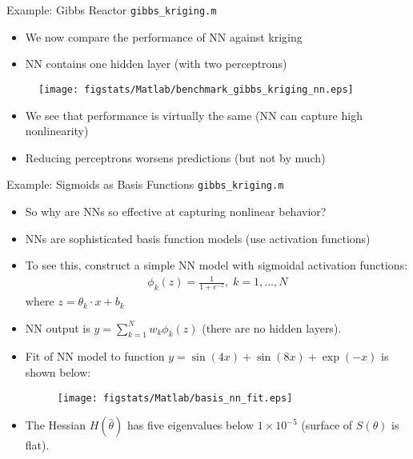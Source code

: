 \documentclass[9pt]{beamer}
\begin{document}
\begin{frame}{Example: Gibbs Reactor \footnotesize{\texttt{gibbs\_kriging.m}}}

\begin{itemize}
   \setlength{\itemsep}{5pt}
\item We now compare the performance of NN against kriging
\item NN contains one hidden layer (with two perceptrons) 
\end{itemize}


\begin{figure}[!htb]
    \centering
	\texttt{[image: figstats/Matlab/benchmark\_gibbs\_kriging\_nn.eps]}
\end{figure}

\begin{itemize}
   \setlength{\itemsep}{5pt}
\item We see that performance is virtually the same (NN can capture high nonlinearity)
\item Reducing perceptrons worsens predictions (but not by much)
\end{itemize}

\end{frame}

\begin{frame}{Example: Sigmoids as Basis Functions \footnotesize{\texttt{gibbs\_kriging.m}}}

\begin{itemize}
\item So why are NNs so effective at capturing nonlinear behavior? 
\item NNs are sophisticated basis function models (use activation functions)
\item To see this, construct a simple NN model with sigmoidal activation functions:
\begin{align*}
\phi_k(z)=\frac{1}{1+e^{-z}},\; k=1,...,N
\end{align*}
where $z=\theta_k\cdot x + b_k$ 
\item NN output is $y=\sum_{k=1}^Nw_k\phi_k(z)$ (there are no hidden layers).  
\item Fit of NN model to function $y=\sin(4x)+\sin(8x)+\exp(-x)$ is shown below:

\begin{figure}[!htb]
    \centering
	\texttt{[image: figstats/Matlab/basis\_nn\_fit.eps]}
\end{figure}

\item The Hessian $H(\hat{\theta})$ has five eigenvalues below $1\times 10^{-5}$ (surface of $S(\theta)$ is flat). 
\end{itemize}

\end{frame}
\end{document}
